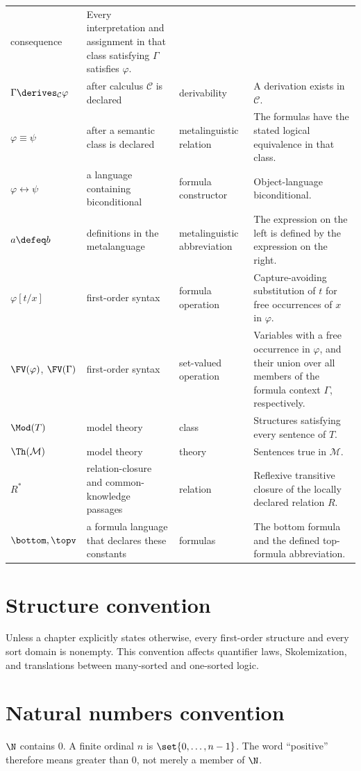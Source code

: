 \begin{longtable}{@{}p{}p{}p{}p{}@{}}
consequence & Every interpretation and assignment in that class satisfying
\(\Gamma\) satisfies \(\varphi\). \\
\(\Gamma\derives_{\mathcal C}\varphi\) & after calculus \(\mathcal C\) is
declared & derivability & A derivation exists in \(\mathcal C\). \\
\(\varphi\equiv\psi\) & after a semantic class is declared & metalinguistic
relation & The formulas have the stated logical equivalence in that class. \\
\(\varphi\leftrightarrow\psi\) & a language containing biconditional & formula
constructor & Object-language biconditional. \\
\(a\defeq b\) & definitions in the metalanguage & metalinguistic abbreviation &
The expression on the left is defined by the expression on the right. \\
\(\varphi[t/x]\) & first-order syntax & formula operation & Capture-avoiding
substitution of \(t\) for free occurrences of \(x\) in \(\varphi\). \\
\(\FV(\varphi)\), \(\FV(\Gamma)\) & first-order syntax & set-valued operation &
Variables with a free occurrence in \(\varphi\), and their union over all
members of the formula context \(\Gamma\), respectively. \\
\(\Mod(T)\) & model theory & class & Structures satisfying every sentence of
\(T\). \\
\(\Th(\mathcal M)\) & model theory & theory & Sentences true in
\(\mathcal M\). \\
\(R^*\) & relation-closure and common-knowledge passages & relation & Reflexive
transitive closure of the locally declared relation \(R\). \\
\(\bottom,\topv\) & a formula language that declares these constants & formulas
& The bottom formula and the defined top-formula abbreviation. \\
\bottomrule
\end{longtable}

\section{Structure convention}
\label{sec:registered-notation-01}

Unless a chapter explicitly states otherwise, every first-order structure and
every sort domain is nonempty.  This convention affects quantifier laws,
Skolemization, and translations between many-sorted and one-sorted logic.

\section{Natural numbers convention}
\label{sec:registered-notation-02}

\(\N\) contains \(0\).  A finite ordinal \(n\) is
\(\set{0,\ldots,n-1}\).  The word ``positive'' therefore means greater
than \(0\), not merely a member of \(\N\).

